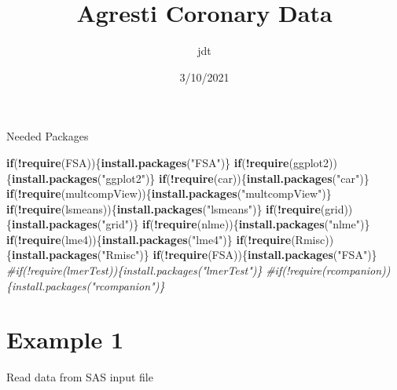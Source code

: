\documentclass[]{article}
\title{Agresti Coronary Data}
\author{jdt}
\date{3/10/2021}
\newenvironment{Shaded}{\begin{snugshade}}{\end{snugshade}}
\newcommand{\KeywordTok}[1]{\textcolor[rgb]{0.13,0.29,0.53}{\textbf{#1}}}
\newcommand{\StringTok}[1]{\textcolor[rgb]{0.31,0.60,0.02}{#1}}
\newcommand{\CommentTok}[1]{\textcolor[rgb]{0.56,0.35,0.01}{\textit{#1}}}
\newcommand{\ControlFlowTok}[1]{\textcolor[rgb]{0.13,0.29,0.53}{\textbf{#1}}}
\newcommand{\OperatorTok}[1]{\textcolor[rgb]{0.81,0.36,0.00}{\textbf{#1}}}
\newcommand{\NormalTok}[1]{#1}
\begin{document}
\maketitle

Needed Packages

\begin{Shaded}
\begin{Highlighting}[]
\ControlFlowTok{if}\NormalTok{(}\OperatorTok{!}\KeywordTok{require}\NormalTok{(FSA))\{}\KeywordTok{install.packages}\NormalTok{(}\StringTok{"FSA"}\NormalTok{)\}}
\ControlFlowTok{if}\NormalTok{(}\OperatorTok{!}\KeywordTok{require}\NormalTok{(ggplot2))\{}\KeywordTok{install.packages}\NormalTok{(}\StringTok{"ggplot2"}\NormalTok{)\}}
\ControlFlowTok{if}\NormalTok{(}\OperatorTok{!}\KeywordTok{require}\NormalTok{(car))\{}\KeywordTok{install.packages}\NormalTok{(}\StringTok{"car"}\NormalTok{)\}}
\ControlFlowTok{if}\NormalTok{(}\OperatorTok{!}\KeywordTok{require}\NormalTok{(multcompView))\{}\KeywordTok{install.packages}\NormalTok{(}\StringTok{"multcompView"}\NormalTok{)\}}
\ControlFlowTok{if}\NormalTok{(}\OperatorTok{!}\KeywordTok{require}\NormalTok{(lsmeans))\{}\KeywordTok{install.packages}\NormalTok{(}\StringTok{"lsmeans"}\NormalTok{)\}}
\ControlFlowTok{if}\NormalTok{(}\OperatorTok{!}\KeywordTok{require}\NormalTok{(grid))\{}\KeywordTok{install.packages}\NormalTok{(}\StringTok{"grid"}\NormalTok{)\}}
\ControlFlowTok{if}\NormalTok{(}\OperatorTok{!}\KeywordTok{require}\NormalTok{(nlme))\{}\KeywordTok{install.packages}\NormalTok{(}\StringTok{"nlme"}\NormalTok{)\}}
\ControlFlowTok{if}\NormalTok{(}\OperatorTok{!}\KeywordTok{require}\NormalTok{(lme4))\{}\KeywordTok{install.packages}\NormalTok{(}\StringTok{"lme4"}\NormalTok{)\}}
\ControlFlowTok{if}\NormalTok{(}\OperatorTok{!}\KeywordTok{require}\NormalTok{(Rmisc))\{}\KeywordTok{install.packages}\NormalTok{(}\StringTok{"Rmisc"}\NormalTok{)\}}
\ControlFlowTok{if}\NormalTok{(}\OperatorTok{!}\KeywordTok{require}\NormalTok{(FSA))\{}\KeywordTok{install.packages}\NormalTok{(}\StringTok{"FSA"}\NormalTok{)\}}
\CommentTok{#if(!require(lmerTest))\{install.packages("lmerTest")\}}
\CommentTok{#if(!require(rcompanion))\{install.packages("rcompanion")\}}
\end{Highlighting}
\end{Shaded}

\section{Example 1}\label{example-1}

Read data from SAS input file
\end{document}
